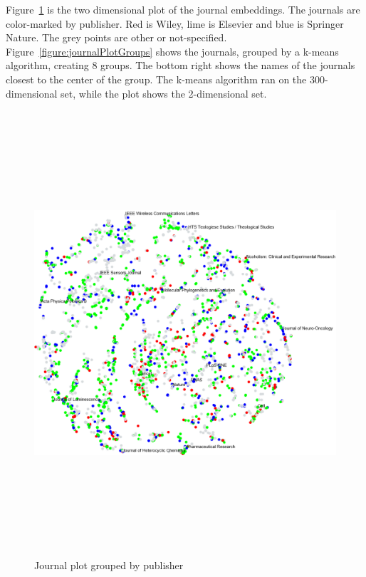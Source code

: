 \documentclass[../../Thesis.tex]{subfiles}
\begin{document}
Figure~\ref{figure:journalPlotNormal} is the two dimensional plot of the journal embeddings. The journals are color-marked by publisher. Red is Wiley, lime is Elsevier and blue is Springer Nature. The grey points are other or not-specified.
Figure~\ref{figure:journalPlotGroups} shows the journals, grouped by a k-means algorithm, creating 8 groups. The bottom right shows the names of the journals closest to the center of the group. The k-means algorithm ran on the 300-dimensional set, while the plot shows the 2-dimensional set.
\begin{landscape}
\begin{figure}
\begin{center}
\includegraphics[height=6.5in]{Plots/journal_plot_normal}
\end{center}
\caption{Journal plot grouped by publisher}\label{figure:journalPlotNormal}
\end{figure}
\end{landscape}
\end{document}
